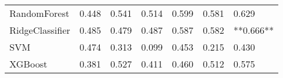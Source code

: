 \begin{tabular}{lllllll}
                   RandomForest & 0.448 &                     0.541 &                 0.514 &                  0.599 &                                   0.581 &     0.629 \\
                RidgeClassifier & 0.485 &                     0.479 &                 0.487 &                  0.587 &                                   0.582 & **0.666** \\
                            SVM & 0.474 &                     0.313 &                 0.099 &                  0.453 &                                   0.215 &     0.430 \\
                        XGBoost & 0.381 &                     0.527 &                 0.411 &                  0.460 &                                   0.512 &     0.575 \\
\bottomrule
\end{tabular}

